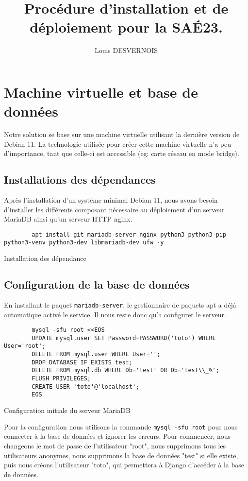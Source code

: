 \documentclass{article}
\author{Louis DESVERNOIS}
\title{Procédure d'installation et de déploiement pour la SAÉ23.}
\begin{document}
    \maketitle
    \tableofcontents
    \listoffigures
    \listoflistings
    \newpage
    \section{Machine virtuelle et base de données}
        Notre solution se base sur une machine virtuelle utilisant la dernière version de Debian 11. La technologie utilisée pour créer cette machine virtuelle n'a peu d'importance, tant que celle-ci est accessible (eg: carte réseau en mode bridge).
            \subsection{Installations des dépendances}
            Après l'installation d'un système minimal Debian 11, nous avons besoin d'installer les différents composant nécessaire au déploiement d'un serveur MariaDB ainsi qu'un serveur HTTP nginx.
            \begin{listing}[H]
                \begin{verbatim}
        apt install git mariadb-server nginx python3 python3-pip python3-venv python3-dev libmariadb-dev ufw -y               
                \end{verbatim}
                \caption{Installation des dépendance}
                \label{lst:deps-install}
            \end{listing}
            \subsection{Configuration de la base de données}
            En installant le paquet \verb|mariadb-server|, le gestionnaire de paquets apt a déjà automatique activé le service. Il nous reste donc qu'a configurer le serveur.
            \begin{listing}[H]
                \begin{verbatim}
        mysql -sfu root <<EOS
        UPDATE mysql.user SET Password=PASSWORD('toto') WHERE User='root';
        DELETE FROM mysql.user WHERE User='';
        DROP DATABASE IF EXISTS test;
        DELETE FROM mysql.db WHERE Db='test' OR Db='test\\_%';
        FLUSH PRIVILEGES;
        CREATE USER 'toto'@'localhost';
        EOS
                \end{verbatim}
                \caption{Configuration initiale du serveur MariaDB}
            \end{listing}
            Pour la configuration nous utilisons la commande \verb|mysql -sfu root| pour nous connecter à la base de données et ignorer les erreurs. Pour commencer, nous changeons le mot de passe de l'utilisateur "root", nous supprimons tous les utilisateurs anonymes, nous supprimons la base de données "test" si elle existe, puis nous créons l'utilisateur "toto", qui permettera à Django d'accéder à la base de données.
\end{document}
